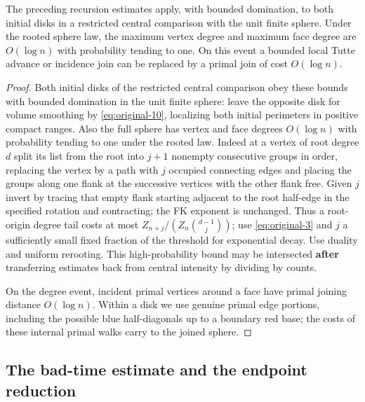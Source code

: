 \begin{lemma}\label{end:finite-sphere-transfer}
The preceding recursion estimates apply, with bounded domination, to both
initial disks in a restricted central comparison with the unit finite sphere.
Under the rooted sphere law, the maximum vertex degree and maximum face degree
are $O(\log n)$ with probability tending to one. On this event a bounded local
Tutte advance or incidence join can be replaced by a primal join of cost
$O(\log n)$.
\end{lemma}

\begin{proof}

Both initial disks of the restricted central comparison obey these bounds with bounded
domination in the unit finite sphere: leave the opposite disk for volume smoothing by
\eqref{eq:original-10}, localizing both initial perimeters in positive compact ranges.
Also the full sphere has vertex and face degrees \(O(\log n)\) with probability tending to
one under the rooted law. Indeed at a vertex of root degree \(d\) split its list from the
root into \(j+1\) nonempty consecutive groups in order, replacing the vertex by a path
with \(j\) occupied connecting edges and placing the groups along one flank at the
successive vertices with the other flank free. Given \(j\) invert by tracing that empty
flank starting adjacent to the root half-edge in the specified rotation and contracting;
the FK exponent is unchanged. Thus a root-origin degree tail costs at most
\(Z_{n+j}/(Z_n\binom{d-1}{j})\); use \eqref{eq:original-3} and \(j\) a sufficiently small
fixed fraction of the threshold for exponential decay. Use duality and uniform rerooting.
This high-probability bound may be intersected \textbf{after} transferring estimates back
from central intensity by dividing by counts.

On the degree event, incident primal vertices around a face have primal
joining distance $O(\log n)$. Within a disk we use genuine primal edge portions,
including the possible blue half-diagonals up to a boundary red base; the costs
of these internal primal walks carry to the joined sphere.

\end{proof}

\subsection{The bad-time estimate and the endpoint reduction}

